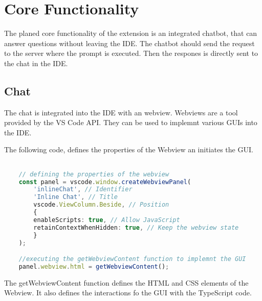\section{Core Functionality}
The planed core functionality of the extension is an integrated chatbot, that can answer questions without leaving the IDE. 
The chatbot should send the request to the server where the prompt is executed. Then the respones is directly sent to the chat in the IDE. 

\subsection{Chat}

The chat is integrated into the IDE with an webview. 
Webviews are a tool provided by the VS Code API. They can be used to implemnt various GUIs into the IDE. 

The following code, defines the properties of the Webview an initiates the GUI.

\begin{lstlisting}[language=TypeScript, caption={Create webview}]

    // defining the properties of the webview
    const panel = vscode.window.createWebviewPanel(
        'inlineChat', // Identifier
        'Inline Chat', // Title
        vscode.ViewColumn.Beside, // Position
        {
        enableScripts: true, // Allow JavaScript
        retainContextWhenHidden: true, // Keep the webview state
        }
    );

    //executing the getWebviewContent function to implemnt the GUI
    panel.webview.html = getWebviewContent();

\end{lstlisting}

The getWebviewContent function defines the HTML and CSS elements of the Webview.
It also defines the interactions fo the GUI with the TypeScript code. 

